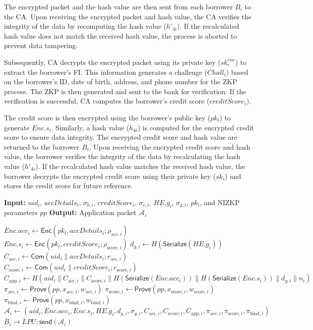 \documentclass[a4paper,fleqn]{cas-dc}
\begin{document}
The encrypted packet and the hash value are then sent from each borrower $B_i$ to the CA. Upon receiving the encrypted packet and hash value, the CA verifies the integrity of the data by recomputing the hash value ($h'_{3i}$). If the recalculated hash value does not match the received hash value, the process is aborted to prevent data tampering.

Subsequently, CA decrypts the encrypted packet using its private key ($sk_c^{enc}$) to extract the borrower's FI. This information generates a challenge ($Chall_i$) based on the borrower's ID, date of birth, address, and phone number for the ZKP process. The ZKP is then generated and sent to the bank for verification. If the verification is successful, CA computes the borrower's credit score ($creditScore_i$).

The credit score is then encrypted using the borrower's public key ($pk_i$) to generate $Enc.s_i$. Similarly, a hash value ($h_{4i}$) is computed for the encrypted credit score to ensure data integrity. The encrypted credit score and hash value are returned to the borrower $B_i$. Upon receiving the encrypted credit score and hash value, the borrower verifies the integrity of the data by recalculating the hash value ($h'_{4i}$). If the recalculated hash value matches the received hash value, the borrower decrypts the encrypted credit score using their private key ($sk_i$) and stores the credit score for future reference.


\begin{algorithm}[h] \caption{Loan Application and NIZKP Generation} \label{alg:loan_application} \textbf{Input:} $uid_i$, $accDetails_i$, $\sigma_{b,i}$, $creditScore_i$, $\sigma_{c,i}$, $HE.g_i$, $\sigma_{g,i}$, $pk_l$, and NIZKP parameters $pp$ \textbf{Output:} Application packet $\mathcal{A}_i$ \begin{algorithmic}[1]  \State $Enc.acc_i \leftarrow \mathsf{Enc} (pk_l,accDetails_i;\rho_{\mathrm{acc},i})$ \State $Enc.s_i \leftarrow \mathsf{Enc} (pk_l,creditScore_i;\rho_{\mathrm{score},i})$ \State $d_{g,i} \leftarrow H(\mathsf{Serialize}(HE.g_i))$ \State $C_{\mathrm{acc},i} \leftarrow \mathsf{Com} (uid_i\parallel accDetails_i;r_{\mathrm{acc},i})$ \State $C_{\mathrm{score},i} \leftarrow \mathsf{Com} (uid_i\parallel creditScore_i;r_{\mathrm{score},i})$ \State $C_{\mathrm{app},i} \leftarrow H( uid_i \parallel C_{\mathrm{acc},i} \parallel C_{\mathrm{score},i} \parallel H(\mathsf{Serialize}(Enc.acc_i)) \parallel H(\mathsf{Serialize}(Enc.s_i)) \parallel d_{g,i} \parallel n_i)$ \State $\pi_{\mathrm{acc},i} \leftarrow \mathsf{Prove} (pp,x_{\mathrm{acc},i},w_{\mathrm{acc},i})$ \State $\pi_{\mathrm{score},i} \leftarrow \mathsf{Prove} (pp,x_{\mathrm{score},i},w_{\mathrm{score},i})$ \State $\pi_{\mathrm{bind},i} \leftarrow \mathsf{Prove} (pp,x_{\mathrm{bind},i},w_{\mathrm{bind},i})$ \State $\mathcal{A}_i \leftarrow ( uid_i, Enc.acc_i, Enc.s_i, HE.g_i, d_{g,i}, \sigma_{g,i}, C_{\mathrm{acc},i}, C_{\mathrm{score},i}, C_{\mathrm{app},i}, \pi_{\mathrm{acc},i}, \pi_{\mathrm{score},i}, \pi_{\mathrm{bind},i} )$ \State $B_i\rightarrow LPU: \mathsf{send}(\mathcal{A}_i)$ \EndFor 
\end{algorithmic} 
\end{algorithm}
\end{document}
